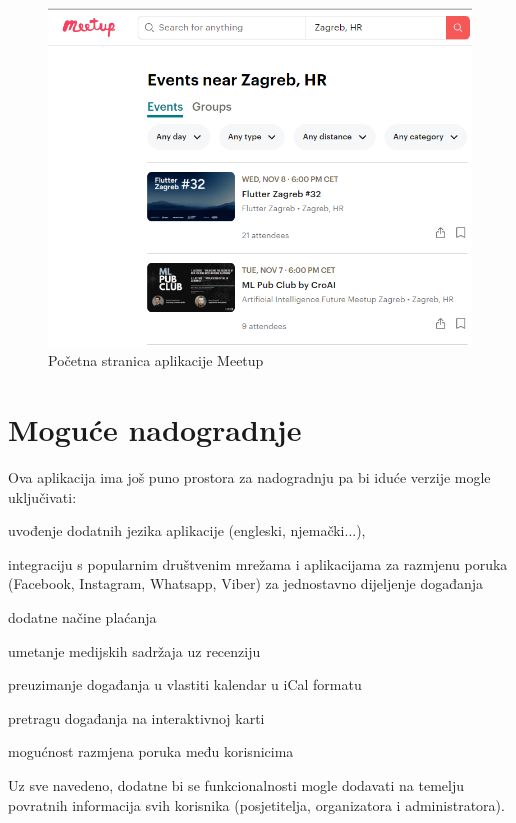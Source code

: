 		\begin{figure}[H]
			\includegraphics[scale=0.7]{slike/Meetup.png}
			\centering
			\caption{Početna stranica aplikacije Meetup}
		\end{figure}
		
		\section{Moguće nadogradnje}
		
		Ova aplikacija ima još puno prostora za nadogradnju pa bi iduće verzije mogle uključivati:
			
			\begin{packed_enum}
				\item uvođenje dodatnih jezika aplikacije (engleski, njemački...),
				\item integraciju s popularnim društvenim mrežama i aplikacijama za razmjenu poruka (Facebook, Instagram, Whatsapp, Viber) za jednostavno dijeljenje događanja
				\item dodatne načine plaćanja
				\item umetanje medijskih sadržaja uz recenziju
				\item preuzimanje događanja u vlastiti kalendar u iCal formatu
				\item pretragu događanja na interaktivnoj karti
				\item mogućnost razmjena poruka među korisnicima
			\end{packed_enum}
			
		Uz sve navedeno, dodatne bi se funkcionalnosti mogle dodavati na temelju povratnih informacija svih korisnika (posjetitelja, organizatora i administratora).
		
		\eject
		
	